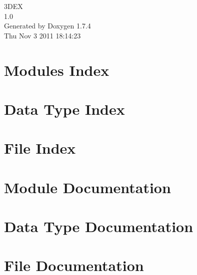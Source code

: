 \documentclass[a4paper]{book}
\begin{document}
\hypersetup{pageanchor=false}
\begin{titlepage}
\vspace*{7cm}
\begin{center}
{\Large 3DEX \\[1ex]\large 1.0 }\\
\vspace*{1cm}
{\large Generated by Doxygen 1.7.4}\\
\vspace*{0.5cm}
{\small Thu Nov 3 2011 18:14:23}\\
\end{center}
\end{titlepage}
\clearemptydoublepage
{}
\tableofcontents
\clearemptydoublepage
{}
\hypersetup{pageanchor=true}
\chapter{Modules Index}

\chapter{Data Type Index}

\chapter{File Index}

\chapter{Module Documentation}





\chapter{Data Type Documentation}

\chapter{File Documentation}











\printindex
\end{document}
